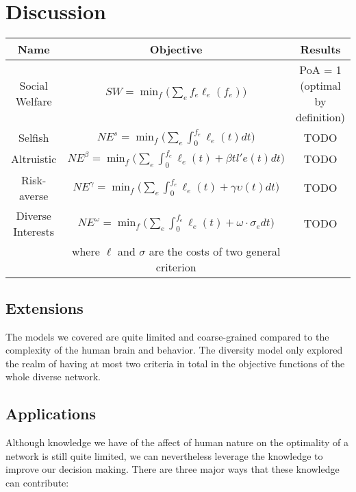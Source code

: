 \section{Discussion}\label{sec:discussion}

\begin{table}[h]
\begin{center}
 \begin{tabular}{|c | c | c|} 
 \hline
 Name & Objective & Results \\
 \hline\hline
     Social Welfare & $SW = \min_f\Big(\sum_e f_e\ell_e(f_e)\Big)$ & PoA = 1 (optimal by definition) \\
 \hline
     Selfish & $NE^s = \min_f\Big(\sum_e\int_0^{f_e} \ell_e(t)dt\Big)$ & TODO\\
 \hline
     Altruistic & $NE^\beta = \min_f\Big(\sum_e\int_0^{f_e} \ell_e(t) + \beta tl'e(t)dt\Big)$ & TODO\\
\hline
     Risk-averse & $NE^\gamma = \min_f\Big(\sum_e\int_0^{f_e} \ell_e(t) + \gamma\upsilon(t)dt\Big)$ & TODO\\
\hline
     Diverse Interests & $NE^\omega = \min_f\Big(\sum_e\int_0^{f_e} \ell_e(t) + \omega\cdot \sigma_e dt\Big)$ & TODO\\
     & where $\ell$ and $\sigma$ are the costs of two general criterion &\\
\hline
\end{tabular}
\end{center}
\end{table}

\subsection{Extensions}

The models we covered are quite limited and coarse-grained compared to the complexity of the human brain and behavior. The diversity model only explored the realm of having at most two criteria in total in the objective functions of the whole diverse network.


\subsection{Applications}

Although knowledge we have of the affect of human nature on the optimality of a network is still quite limited, we can nevertheless leverage the knowledge to improve our decision making. There are three major ways that these knowledge can contribute:


